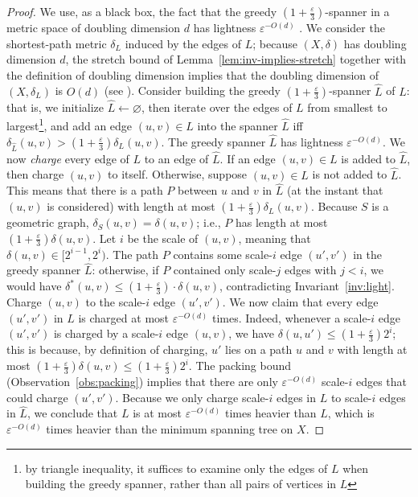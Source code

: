 \documentclass[11pt]{article}
\let\e\varepsilon               %
\def\EMPH#1{\emph{\textcolor{BrickRed} {#1}}}
\newcommand{\dist}{\ensuremath{\delta}}
\newcommand{\ddim}{\ensuremath{d}}
\begin{document}
\begin{proof}
    We use, as a black box, the fact that the greedy $(1+\frac \e 3)$-spanner in a metric space of doubling dimension $d$ has lightness $\e^{-O(d)}$ \cite{BLW19}. We consider the shortest-path metric $\dist_L$ induced by the edges of $L$; because $(X, \dist)$ has doubling dimension $\ddim$, the stretch bound of Lemma~\ref{lem:inv-implies-stretch} together with the definition of doubling dimension implies that the doubling dimension of $(X, \dist_L)$ is $O(\ddim)$ (see \cite[Observation 7]{FS20}).
    Consider building the greedy $(1+ \frac \e 3)$-spanner \EMPH{$\hat L$} of $L$: that is, we initialize $\hat L \gets \varnothing$, then iterate over the edges of $L$ from smallest to largest\footnote{by triangle inequality, it suffices to examine only the edges of $L$ when building the greedy spanner, rather than all pairs of vertices in $L$}, and add an edge $(u,v) \in L$ into the spanner $\hat L$ iff $\dist_{\hat L}(u,v) > (1+ \frac \e 3) \dist_L(u,v)$. 
    The greedy spanner $\hat L$ has lightness $\e^{-O(\ddim)}$.
    We now \EMPH{charge} every edge of $L$ to an edge of $\hat L$. If an edge $(u,v) \in L$ is added to $\hat L$, then charge $(u,v)$ to itself. 
    Otherwise, suppose $(u,v) \in L$ is not added to $\hat L$. This means that there is a path $P$ between $u$ and $v$ in $\hat L$ (at the instant that $(u,v)$ is considered) with length at most $(1+ \frac \e 3) \dist_L(u,v)$. 
    Because $S$ is a geometric graph, $\dist_S(u,v) = \dist(u,v)$; i.e., $P$ has length at most $(1+ \frac \e 3)\dist(u,v)$. Let $i$ be the scale of $(u,v)$, meaning that $\dist(u,v) \in [2^{i-1}, 2^i)$. 
    The path $P$ contains some scale-$i$ edge $(u',v')$ in the greedy spanner $\hat L$: otherwise, if $P$ contained only scale-$j$ edges with $j < i$, we would have $\dist^*(u,v) \le (1+ \frac \e 3) \cdot \dist(u,v)$, contradicting Invariant~\ref{inv:light}. Charge $(u,v)$ to the scale-$i$ edge $(u',v')$.
%
    We now claim that every edge $(u',v')$ in $\hat L$ is charged at most $\e^{-O(\ddim)}$ times. Indeed, whenever a scale-$i$ edge $(u',v')$ is charged by a scale-$i$ edge $(u,v)$, we have $\dist(u,u') \le (1+\frac \e 3) 2^i$; this is because, by definition of charging, $u'$ lies on a path $u$ and $v$ with length at most $(1+ \frac \e 3) \dist(u,v) \le (1+ \frac \e 3) 2^i$. The packing bound (Observation~\ref{obs:packing}) implies that there are only $\e^{-O(\ddim)}$ scale-$i$ edges that could charge $(u',v')$. Because we only charge scale-$i$ edges in $L$ to scale-$i$ edges in $\hat L$, we conclude that $L$ is at most $\e^{-O(\ddim)}$ times heavier than $L$, which is $\e^{-O(\ddim)}$ times heavier than the minimum spanning tree on $X$.
\end{proof}
%
%
\end{document}
